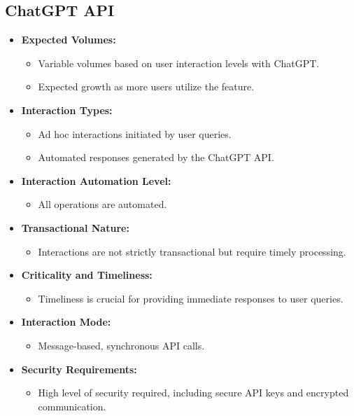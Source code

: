 \subsection*{ChatGPT API}
\begin{itemize}
    \item \textbf{Expected Volumes:}
          \begin{itemize}
              \item Variable volumes based on user interaction levels with ChatGPT.
              \item Expected growth as more users utilize the feature.
          \end{itemize}
    \item \textbf{Interaction Types:}
          \begin{itemize}
              \item Ad hoc interactions initiated by user queries.
              \item Automated responses generated by the ChatGPT API.
          \end{itemize}
    \item \textbf{Interaction Automation Level:}
          \begin{itemize}
              \item All operations are automated.
          \end{itemize}
    \item \textbf{Transactional Nature:}
          \begin{itemize}
              \item Interactions are not strictly transactional but require timely processing.
          \end{itemize}
    \item \textbf{Criticality and Timeliness:}
          \begin{itemize}
              \item Timeliness is crucial for providing immediate responses to user queries.
          \end{itemize}
    \item \textbf{Interaction Mode:}
          \begin{itemize}
              \item Message-based, synchronous API calls.
          \end{itemize}
    \item \textbf{Security Requirements:}
          \begin{itemize}
              \item High level of security required, including secure API keys and encrypted communication.

\end{itemize}
\end{itemize}
